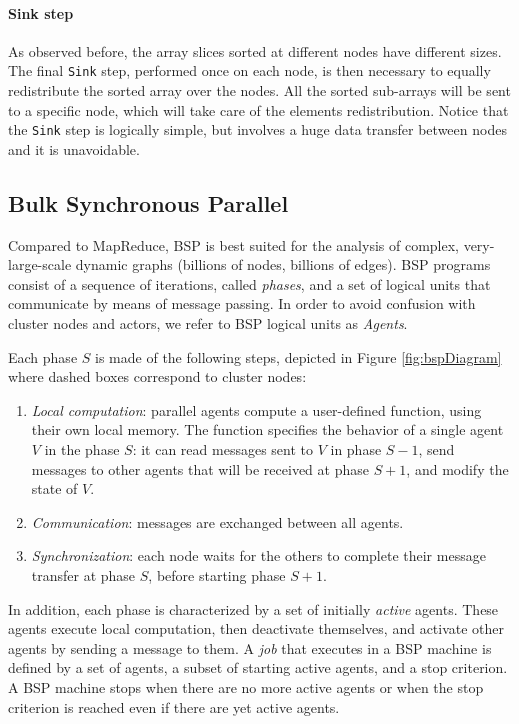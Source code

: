 \documentclass[a4paper]{article}
\numberwithin{equation}{section}
\begin{document}
\paragraph{Sink step}
As observed before, the array slices sorted at different nodes have
different sizes. The final \verb+Sink+ step, performed once on each
node, is then necessary to equally redistribute the sorted array over
the nodes. All the sorted sub-arrays will be sent to a specific node,
which will take care of the elements redistribution.
Notice that the \verb+Sink+ step is logically simple, but involves a
huge data transfer between nodes and it is unavoidable.

\subsection{Bulk Synchronous Parallel}
\label{subsec:BSP}

Compared to MapReduce, BSP is best suited for the analysis of complex,
very-large-scale dynamic graphs (billions of nodes, billions of
edges). 
BSP programs consist of a sequence of iterations, called
\textit{phases}, and a set of logical units that communicate by means
of message passing. 
In order to avoid confusion with cluster nodes and actors, 
we refer to BSP logical units as \textit{Agents}.

Each phase $S$ is made of the following steps, 
depicted in Figure \ref{fig:bspDiagram} where dashed boxes
correspond to cluster nodes:
\begin{enumerate}
\item \emph{Local computation}: parallel agents compute a user-defined
  function, using their own 
  local memory. The function specifies the behavior of a single agent
  $V$ in the phase $S$: it can read messages sent to $V$ in
  phase $S-1$, send messages to other agents that will be received at
  phase $S+1$, and modify the state of $V$. 
\item \emph{Communication}: messages are exchanged between all
  agents.
\item \emph{Synchronization}: each node waits for the others to
  complete their message transfer at phase $S$, before starting phase
  $S+1$.
\end{enumerate}

In addition, each phase is characterized by a set of initially
\emph{active} agents. These agents execute local computation, then
deactivate themselves, and activate other agents by sending a
message to them. 
A \emph{job} that executes in a BSP machine is defined by a set of
agents, a subset of starting active agents, and a stop criterion. 
A BSP machine stops when there are no more active agents or when the
stop criterion is reached even if there are yet active agents.
\end{document}
